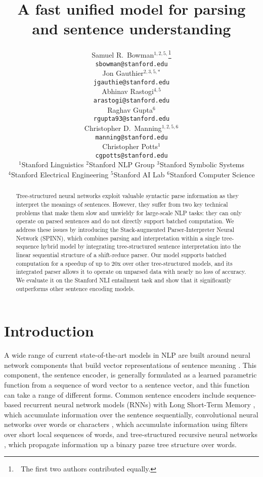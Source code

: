 \documentclass[11pt]{article}
\title{A fast unified model for parsing and sentence understanding}
\author{
    Samuel R.\ Bowman$^{1,2,5,}$\thanks{~\,The first two authors contributed equally.} \\
    \texttt{\small sbowman@stanford.edu} \\
    \And
    Jon Gauthier$^{2,3,5,*}$ \\
    \texttt{\small jgauthie@stanford.edu} \\
    \And
    Abhinav Rastogi$^{4,5}$ \\
    \texttt{\small arastogi@stanford.edu} \\
    \AND
    Raghav Gupta$^{6}$ \\
    \texttt{\small rgupta93@stanford.edu} \\
    \And
    Christopher D.\ Manning$^{1,2,5,6}$\\
    \texttt{\small manning@stanford.edu}\\
    \And
    Christopher Potts$^{1}$\\
    \texttt{\small cgpotts@stanford.edu}
    \AND\\[-3ex]
    {$^{1}$Stanford Linguistics\quad
    $^{2}$Stanford NLP Group\quad
    $^{3}$Stanford Symbolic Systems}\\
    {$^{4}$Stanford Electrical Engineering\quad
    $^{5}$Stanford AI Lab\quad
    $^{6}$Stanford Computer Science}
    }
\date{}
\begin{document}
\maketitle
\begin{abstract}

Tree-structured neural networks exploit valuable syntactic parse information as they interpret the meanings of sentences. However, they suffer from two key technical problems that make them slow and unwieldy for large-scale NLP tasks: they can only operate on parsed sentences and do not directly support batched computation. We address these issues by introducing the Stack-augmented Parser-Interpreter Neural Network (SPINN), which combines parsing and interpretation within a single tree-sequence hybrid model by integrating tree-structured sentence interpretation into the linear sequential structure of a shift-reduce parser. Our model supports batched computation for a speedup of up to 20x over other tree-structured models, and its integrated parser allows it to operate on unparsed data with nearly no loss of accuracy. We evaluate it on the Stanford NLI entailment task and show that it significantly outperforms other sentence encoding models.
\end{abstract}

\section{Introduction}




A wide range of current state-of-the-art models in NLP are built around neural network components that build vector representations of sentence meaning \citep{socher2011semi,sutskever2014sequence}. This component, the sentence encoder, is generally formulated as a learned parametric function from a sequence of word vector to a sentence vector, and this function can take a range of different forms. Common sentence encoders include sequence-based recurrent neural network models (RNNs) with Long Short-Term Memory \citep[LSTM,][see Figure~\ref{fig:batching:good}]{hochreiter1997long}, which accumulate information over the sentence sequentially, convolutional neural networks over words or characters \citep{kalchbrenner2014convolutional,DBLP:journals/corr/ZhangZL15}, which accumulate information using filters over short local sequences of words, and tree-structured recursive neural networks \citep[TreeRNNs,][see Figure~\ref{fig:batching:bad}]{goller1996learning,socher2011semi}, which propagate information up a binary parse tree structure over words. 
\end{document}
